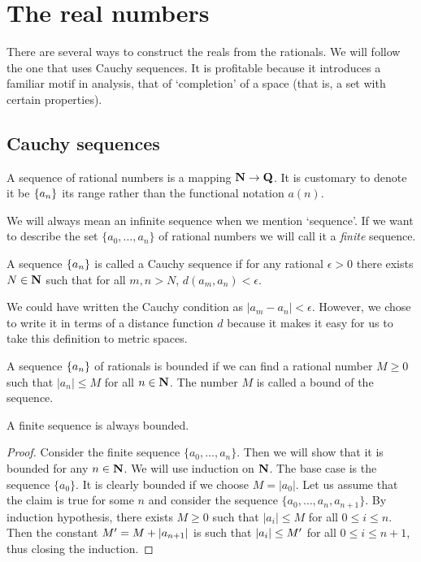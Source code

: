 \chapter{The real numbers}\label{c4}
There are several ways to construct the reals from the rationals. We will
follow the one that uses Cauchy sequences. It is profitable because it 
introduces a familiar motif in analysis, that of `completion' of a space
(that is, a set with certain properties).

\section{Cauchy sequences}\label{c4s1}
\begin{defn}\label{c4s1d1}
A sequence of rational numbers is a mapping $\mathbf{N} \rightarrow \mathbf{Q}$. It is
customary to denote it be $\{a_n\}$ its range rather than the functional
notation $a(n)$.
\end{defn}

\begin{rem}
We will always mean an infinite sequence when we mention `sequence'. If we
want to describe the set $\{a_0, \ldots, a_n\}$ of rational numbers we will
call it a \emph{finite} sequence.
\end{rem}

\begin{defn}\label{c4s1d2}
A sequence $\{a_n\}$ is called a Cauchy sequence if for any rational 
$\epsilon > 0$ there exists $N \in \mathbf{N}$ such that for all $m, n > N$,
$d(a_m, a_n) < \epsilon$.
\end{defn}

\begin{rem}
We could have written the Cauchy condition as $|a_m - a_n| < \epsilon$. 
However, we chose to write it in terms of a distance function $d$ because
it makes it easy for us to take this definition to metric spaces.
\end{rem}

\begin{defn}\label{c4s1d3}
A sequence $\{a_n\}$ of rationals is bounded if we can find a rational 
number $M \ge 0$ such that $|a_n| \le M$ for all $n \in \mathbf{N}$. The number
$M$ is called a bound of the sequence.
\end{defn}

\begin{lem}\label{c4s1l1}
A finite sequence is always bounded.
\end{lem}
\begin{proof}
Consider the finite sequence $\{a_0, \ldots, a_n\}$. Then we will show 
that it is bounded for any $n \in \mathbf{N}$. We will use induction on $\mathbf{N}$.
The base case is the sequence $\{a_0\}$. It is clearly bounded if we choose
$M = |a_0|$. Let us assume that the claim is true for some $n$ and consider
the sequence $\{a_0, \ldots, a_n, a_{n+1}\}$. By induction hypothesis, 
there exists $M \ge 0$ such that $|a_i| \le M$ for all $0 \le i \le n$. 
Then the constant $M^\prime = M + |a_{n+1}|$ is such that $|a_i| \le M^\prime$
for all $0 \le i \le n + 1$, thus closing the induction.
\end{proof}

